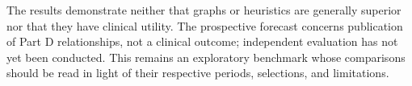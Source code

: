 The results demonstrate neither that graphs or heuristics are generally superior nor that they have clinical utility. The prospective forecast concerns publication of Part D relationships, not a clinical outcome; independent evaluation has not yet been conducted. This remains an exploratory benchmark whose comparisons should be read in light of their respective periods, selections, and limitations.
